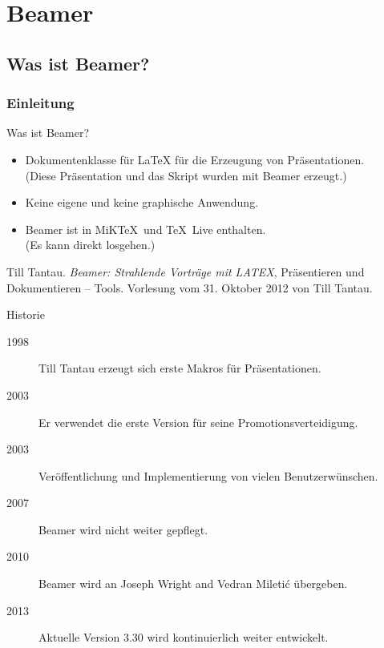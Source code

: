 \chapter{Beamer}


\website

\section{Was ist Beamer?}

\subsection{Einleitung}

\begin{Frame}{Was ist Beamer?}
  \begin{itemize}
    \item \alert{Dokumentenklasse für \LaTeX} für die Erzeugung von Präsentationen.\\
      (Diese Präsentation und das Skript wurden mit Beamer erzeugt.)
    \item Keine eigene und \alert{keine graphische Anwendung}.
    \item Beamer ist in MiK\TeX\ und \TeX\ Live enthalten.\\
      (\alert{Es kann direkt losgehen}.)
  \end{itemize}

  \xxx

  \begin{mybib}
      Till Tantau.
      \newblock \emph{Beamer: Strahlende Vorträge mit LATEX},
      \newblock Präsentieren und Dokumentieren -- Tools.
      \newblock Vorlesung vom 31. Oktober 2012 von Till Tantau.
  \end{mybib}
\end{Frame}

\begin{Frame}{Historie}
  \begin{description}
    \item[1998] Till Tantau erzeugt sich erste Makros für Präsentationen.
    \item[2003] Er verwendet die erste Version für seine Promotionsverteidigung.
    \item[2003] Veröffentlichung und Implementierung von vielen Benutzerwünschen.
    \item[2007] Beamer wird nicht weiter gepflegt.
    \item[2010] Beamer wird an Joseph Wright and Vedran Mileti\'c übergeben.
    \item[2013] Aktuelle Version 3.30 wird kontinuierlich weiter entwickelt.
  \end{description}
\end{Frame}

